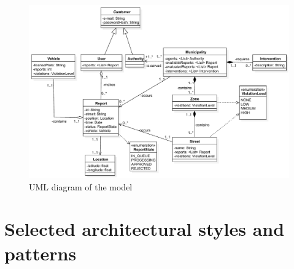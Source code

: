 \documentclass[12pt,a4paper]{report}
\begin{document}
		\begin{figure}[H]
				\includegraphics [scale = 0.7, center]{uml}
				\caption{UML diagram of the model}
		\end{figure}

		\section{Selected architectural styles and patterns}
\end{document}
